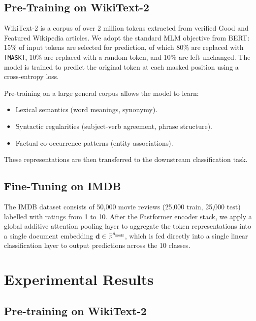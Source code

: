 \documentclass[11pt,a4paper]{article}
\newcommand{\vect}[1]{\mathbf{#1}}
\newcommand{\R}{\mathbb{R}}
\theoremstyle{definition}
\begin{document}
\subsection{Pre-Training on WikiText-2}

WikiText-2 is a corpus of over 2 million tokens extracted from verified Good and Featured
Wikipedia articles.
We adopt the standard MLM objective from BERT: 15\% of input tokens are selected for
prediction, of which 80\% are replaced with \texttt{[MASK]}, 10\% are replaced with a random
token, and 10\% are left unchanged.
The model is trained to predict the original token at each masked position using a
cross-entropy loss.

Pre-training on a large general corpus allows the model to learn:
\begin{itemize}[noitemsep]
  \item Lexical semantics (word meanings, synonymy).
  \item Syntactic regularities (subject-verb agreement, phrase structure).
  \item Factual co-occurrence patterns (entity associations).
\end{itemize}

These representations are then transferred to the downstream classification task.

\subsection{Fine-Tuning on IMDB}

The IMDB dataset consists of 50,000 movie reviews (25,000 train, 25,000 test) labelled with
ratings from 1 to 10.
After the Fastformer encoder stack, we apply a global additive attention pooling layer to
aggregate the token representations into a single document embedding
$\vect{d}\in\R^{d_{\text{model}}}$, which is fed directly into a single linear classification layer
to output predictions across the 10 classes.

\section{Experimental Results}
\label{sec:results}

\subsection{Pre-training on WikiText-2}
\end{document}
